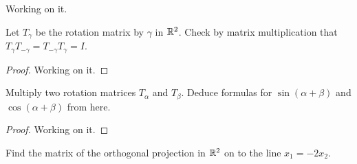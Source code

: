 \documentclass{article}
\begin{document}
\begin{exercise}
  Working on it.
\end{exercise}
\begin{exercise}
  Let $T_{\gamma}$ be the rotation matrix by $\gamma$ in $\R^2$.
  Check by matrix multiplication that 
  $T_{\gamma}T_{-\gamma}=T_{-\gamma}T_{\gamma}=I$.
\end{exercise}
\begin{proof}
  Working on it.
\end{proof}
\begin{exercise}
  Multiply two rotation matrices $T_{\alpha}$ and $T_{\beta}$. Deduce
  formulas for $\sin(\alpha+\beta)$ and $\cos(\alpha+\beta)$
  from here.
\end{exercise}
\begin{proof}
  Working on it.
\end{proof}
\begin{exercise}
  Find the matrix of the orthogonal projection in $\R^2$ on to the line
  $x_1=-2x_2$.
\end{exercise}
\end{document}
